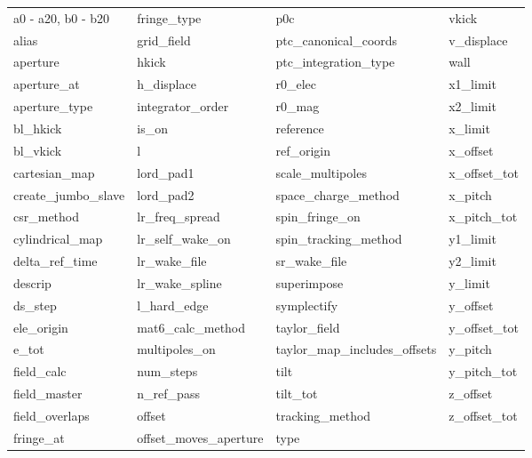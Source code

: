  \begin{tabular}{llll} \toprule
a0 - a20, b0 - b20          & fringe_type                 & p0c                         & vkick                       \\
alias                       & grid_field                  & ptc_canonical_coords        & v_displace                  \\
aperture                    & hkick                       & ptc_integration_type        & wall                        \\
aperture_at                 & h_displace                  & r0_elec                     & x1_limit                    \\
aperture_type               & integrator_order            & r0_mag                      & x2_limit                    \\
bl_hkick                    & is_on                       & reference                   & x_limit                     \\
bl_vkick                    & l                           & ref_origin                  & x_offset                    \\
cartesian_map               & lord_pad1                   & scale_multipoles            & x_offset_tot                \\
create_jumbo_slave          & lord_pad2                   & space_charge_method         & x_pitch                     \\
csr_method                  & lr_freq_spread              & spin_fringe_on              & x_pitch_tot                 \\
cylindrical_map             & lr_self_wake_on             & spin_tracking_method        & y1_limit                    \\
delta_ref_time              & lr_wake_file                & sr_wake_file                & y2_limit                    \\
descrip                     & lr_wake_spline              & superimpose                 & y_limit                     \\
ds_step                     & l_hard_edge                 & symplectify                 & y_offset                    \\
ele_origin                  & mat6_calc_method            & taylor_field                & y_offset_tot                \\
e_tot                       & multipoles_on               & taylor_map_includes_offsets & y_pitch                     \\
field_calc                  & num_steps                   & tilt                        & y_pitch_tot                 \\
field_master                & n_ref_pass                  & tilt_tot                    & z_offset                    \\
field_overlaps              & offset                      & tracking_method             & z_offset_tot                \\
fringe_at                   & offset_moves_aperture       & type                        &                             \\
 \bottomrule
 \end{tabular}
